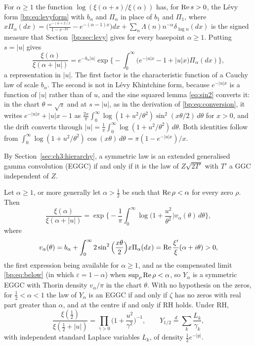 For $\alpha\ge1$ the function $\log(\xi(\alpha+s)/\xi(\alpha))$ has, for $\operatorname{Re} s>0$, the L\'evy form \eqref{bp:eq:levyform} with $b_\alpha$ and $\Pi_\alpha$ in place of $b_1$ and $\Pi_1$, where $x\Pi_\alpha(dx)=\big(\frac{e^{-(\alpha+2)x}}{1-e^{-2x}}-e^{-(\alpha-1)x}\big)dx+\sum_n\Lambda(n)n^{-\alpha}\delta_{\log n}(dx)$ is the signed measure that Section~\ref{bp:sec:levy} gives for every basepoint $\alpha\ge1$. Putting $s=|u|$ gives
\begin{equation}\label{sm:eq:levyu}
\frac{\xi(\alpha)}{\xi(\alpha+|u|)}=e^{-b_\alpha|u|}\exp\Big\{-\int_0^\infty\big(e^{-|u|x}-1+|u|x\big)\Pi_\alpha(dx)\Big\},
\end{equation}
a representation in $|u|$. The first factor is the characteristic function of a Cauchy law of scale $b_\alpha$. The second is not in L\'evy Khintchine form, because $e^{-|u|x}$ is a function of $|u|$ rather than of $u$, and the sine squared lemma \eqref{eq:sin2} converts it: in the chart $\theta=\sqrt z$ and at $s=|u|$, as in the derivation of \eqref{bp:eq:conversion}, it writes $e^{-|u|x}+|u|x-1$ as $\frac{2x}\pi\int_0^\infty\log(1+u^2/\theta^2)\sin^2(x\theta/2)\,d\theta$ for $x>0$, and the drift converts through $|u|=\frac1\pi\int_0^\infty\log(1+u^2/\theta^2)\,d\theta$. Both identities follow from $\int_0^\infty\log(1+u^2/\theta^2)\cos(x\theta)\,d\theta=\pi(1-e^{-|u|x})/x$.

By Section~\ref{sec:ch3:hierarchy}, a symmetric law is an extended generalised gamma convolution (EGGC) if and only if it is the law of $Z\sqrt{2T'}$ with $T'$ a GGC independent of $Z$.

\begin{theorem}\label{sm:thm:thorin}
Let $\alpha\ge1$, or more generally let $\alpha>\frac12$ be such that $\operatorname{Re}\rho<\alpha$ for every zero $\rho$. Then
\begin{equation}\label{sm:eq:thorin}
\frac{\xi(\alpha)}{\xi(\alpha+|u|)}=\exp\Big\{-\frac1\pi\int_0^\infty\log\Big(1+\frac{u^2}{\theta^2}\Big)v_\alpha(\theta)\,d\theta\Big\},
\end{equation}
where
\[
v_\alpha(\theta)=b_\alpha+\int_0^\infty2\sin^2\Big(\frac{x\theta}2\Big)x\Pi_\alpha(dx)=\operatorname{Re}\frac{\xi'}\xi(\alpha+i\theta)>0,
\]
the first expression being available for $\alpha\ge1$, and as the compensated limit \eqref{bp:eq:below} (in which $\varepsilon=1-\alpha$) when $\sup_\rho\operatorname{Re}\rho<\alpha$, so $Y_\alpha$ is a symmetric EGGC with Thorin density $v_\alpha/\pi$ in the chart $\theta$. With no hypothesis on the zeros, for $\frac12<\alpha<1$ the law of $Y_\alpha$ is an EGGC if and only if $\zeta$ has no zeros with real part greater than $\alpha$, and at the centre if and only if RH holds. Under RH,
\[
\frac{\xi(\frac12)}{\xi(\frac12+|u|)}=\prod_{\gamma>0}\Big(1+\frac{u^2}{\gamma^2}\Big)^{-1},\qquad Y_{1/2}\stackrel d=\sum_k\frac{L_k}{\gamma_k},
\]
with independent standard Laplace variables $L_k$, of density $\frac12e^{-|y|}$.
\end{theorem}

